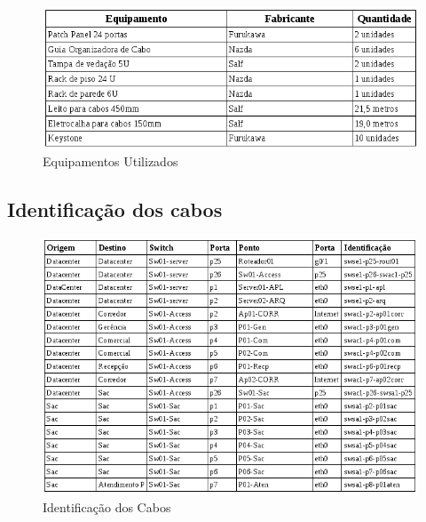 \documentclass[	DIV=calc,%
							paper=a4,%
							fontsize=12pt,%
							onecolumn]{scrartcl}	 					%
\begin{document}
\begin{figure}
	\centering
	\includegraphics[height=\textwidth]{passivos}
	\caption{Equipamentos Utilizados}
	\label{passivos}
\end{figure}


\subsection{Identificação dos cabos}

\begin{figure}
	\centering
	\includegraphics[height=\textwidth]{identificacao}
	\caption{Identificação dos Cabos}
	\label{identificacao}
\end{figure}
\end{document}
